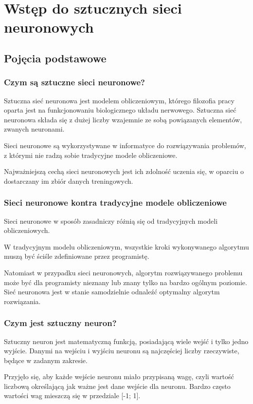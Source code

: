 \chapter{Wstęp do sztucznych sieci neuronowych}
\section{Pojęcia podstawowe}
\subsection{Czym są sztuczne sieci neuronowe?}
Sztuczna sieć neuronowa jest modelem obliczeniowym, którego filozofia pracy oparta jest na funkcjonowaniu biologicznego układu nerwowego.
Sztuczna sieć neuronowa składa się z dużej liczby wzajemnie ze sobą powiązanych elementów, zwanych neuronami.

Sieci neuronowe są wykorzystywane w informatyce do rozwiązywania problemów, z którymi nie radzą sobie tradycyjne modele obliczeniowe.

Najważniejszą cechą sieci neuronowych jest ich zdolność uczenia się, w oparciu o dostarczany im zbiór danych treningowych.

\subsection{Sieci neuronowe kontra tradycyjne modele obliczeniowe}
Sieci neuronowe w sposób zasadniczy różnią się od tradycyjnych modeli obliczeniowych.
 
W tradycyjnym modelu obliczeniowym, wszystkie kroki wykonywanego algorytmu muszą być ściśle zdefiniowane przez programistę.

Natomiast w przypadku sieci neuronowych, algorytm rozwiązywanego problemu może być dla programisty nieznany lub znany tylko na bardzo ogólnym poziomie.
Sieć neuronowa jest w stanie samodzielnie odnaleźć optymalny algorytm rozwiązania.

\subsection{Czym jest sztuczny neuron?}
Sztuczny neuron jest matematyczną funkcją, posiadającą wiele wejść i tylko jedno wyjście. Danymi na wejściu i wyjściu neuronu są najczęściej liczby rzeczywiste, będące  w zadanym zakresie.

Przyjęło się, aby każde wejście neuronu miało przypisaną wagę, czyli wartość liczbową określającą jak ważne jest dane wejście dla neuronu.
Bardzo często wartości wag mieszczą się w przedziale [-1; 1].

